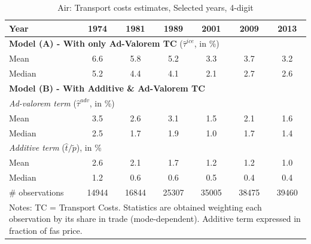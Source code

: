 \documentclass[a4paper,11pt]{article}
\begin{document}
\begin{table}[htbp]
  \centering
  \caption{Air: Transport costs estimates, Selected years, 4-digit}
\begin{center}
    \begin{tabular}{l|cccccc}
   \hline\hline
Year & 1974  & 1981  & 1989  & 2001  & 2009  & 2013 \\ \hline
\multicolumn{7}{l}{\textbf{Model (A) - With only Ad-Valorem TC} ($\widehat{\tau}^{ice}$, in \%) }  \\
\hline
Mean  & 6.6 & 5.8 & 5.2 & 3.3 & 3.7 & 3.2 \\
Median & 5.2 & 4.4 & 4.1 & 2.1 & 2.7 & 2.6 \\
\hline
\multicolumn{7}{l}{\textbf{Model (B) - With Additive \& Ad-Valorem TC}}  \\ \hline
\multicolumn{7}{l}{\textit{Ad-valorem term }($\widehat{\tau}^{adv}$, in \%) }   \\ \hline
Mean  & 3.5 & 2.6 & 3.1 & 1.5 & 2.1 & 1.6  \\
Median & 2.5 & 1.7 & 1.9 & 1.0 & 1.7 & 1.4  \\
\hline
\multicolumn{7}{l}{\textit{Additive term} ($\widehat{t}/\widetilde{p}$), in \%}    \\ \hline
Mean  & 2.6 & 2.1 & 1.7 & 1.2 &1.2 & 1.0 \\
Median & 1.2 & 0.6 & 0.6 & 0.5 & 0.4 & 0.4  \\
\hline
\# observations & 14944 & 16844 & 25307 & \multicolumn{1}{c}{35005} & \multicolumn{1}{c}{38475} & \multicolumn{1}{c}{39460}  \\
\hline\hline
\multicolumn{7}{l}{\parbox[l]{11cm}{ \vspace{7pt}\scriptsize{Notes: TC = Transport Costs. Statistics are obtained weighting each observation by its share in trade (mode-dependent). Additive term expressed in fraction of fas price.}}}
\end{tabular}%
\end{center}
  \label{tab:result_air_rob}
\end{table}%
\end{document}
